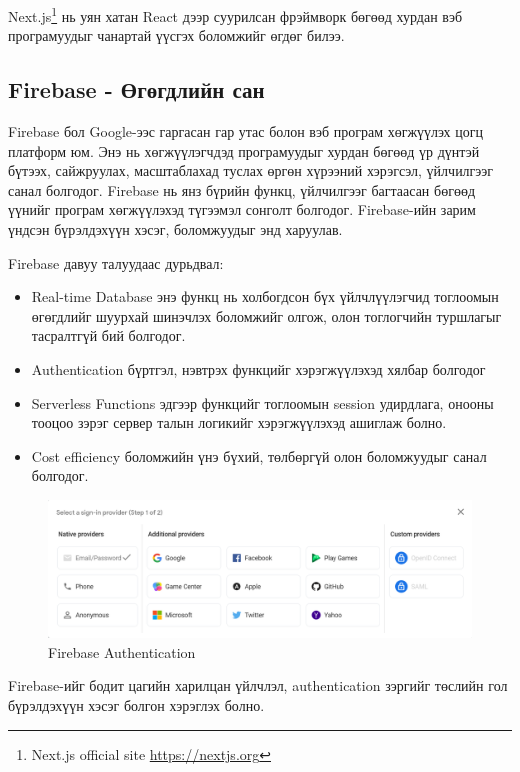 Next.js\footnote{Next.js official site \url{https://nextjs.org}} нь уян хатан React дээр суурилсан фрэймворк бөгөөд хурдан вэб програмуудыг чанартай үүсгэх боломжийг өгдөг билээ. 


\subsection{Firebase - Өгөгдлийн сан}

Firebase бол Google-ээс гаргасан гар утас болон вэб програм хөгжүүлэх цогц платформ юм. Энэ нь хөгжүүлэгчдэд програмуудыг хурдан бөгөөд үр дүнтэй бүтээх, сайжруулах, масштаблахад туслах өргөн хүрээний хэрэгсэл, үйлчилгээг санал болгодог. Firebase нь янз бүрийн функц, үйлчилгээг багтаасан бөгөөд үүнийг програм хөгжүүлэхэд түгээмэл сонголт болгодог. Firebase-ийн зарим үндсэн бүрэлдэхүүн хэсэг, боломжуудыг энд харуулав.



Firebase давуу талуудаас дурьдвал:
\begin{itemize}
	\item Real-time Database энэ функц нь холбогдсон бүх үйлчлүүлэгчид тоглоомын өгөгдлийг шуурхай шинэчлэх боломжийг олгож, олон тоглогчийн туршлагыг тасралтгүй бий болгодог.
	\item Authentication бүртгэл, нэвтрэх функцийг хэрэгжүүлэхэд хялбар болгодог
	\item Serverless Functions эдгээр функцийг тоглоомын session удирдлага, онооны тооцоо зэрэг сервер талын логикийг хэрэгжүүлэхэд ашиглаж болно.
	\item Cost efficiency боломжийн үнэ бүхий, төлбөргүй олон боломжуудыг санал болгодог.
\end{itemize}

\begin{figure}[h]
	\centering
	\includegraphics[width=15cm]{images/firebase_auth.png}
	\caption{Firebase Authentication}
	\label{fig:prisma}
\end{figure}

Firebase-ийг бодит цагийн харилцан үйлчлэл, authentication зэргийг төслийн гол бүрэлдэхүүн хэсэг болгон хэрэглэх болно.

